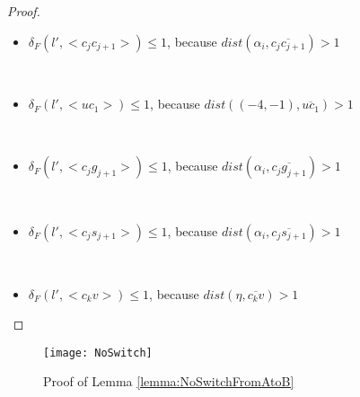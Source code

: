\documentclass[a4paper,UKenglish]{lipics}
\newcommand{\gre}{{g}}
\newcommand{\sma}{{s}}
\newcommand{\distF}{\delta_F}
\newcommand{\Seg}[1]{{\overline{#1}}}
\begin{document}
\begin{proof}
\begin{itemize}
\

\item $\distF(l',<c_jc_{j+1}>) \le 1$,  because $dist( \alpha_{i},\Seg{c_jc_{j+1}}) > 1$

\

\item $\distF(l',<uc_1>) \le 1$, because $dist( (-4,-1),\Seg{uc_1}) >1$ 

\

\item  $\distF(l',<c_j\gre_{j+1}>) \le 1$, because $dist( \alpha_i,\Seg{c_j\gre_{j+1}}) >1$ 

\

\item  $\distF(l',<c_j\sma_{j+1}>) \le 1$, because $dist( \alpha_i,\Seg{c_j\sma_{j+1}}) >1$ 

\

\item  $\distF(l',<c_kv>) \le 1$, because $dist( \eta,\Seg{c_kv}) >1$ 
\end{itemize}

\end{proof}



\begin{figure}
	\centering
	\texttt{[image: NoSwitch]}
	\caption{Proof of Lemma \ref{lemma:NoSwitchFromAtoB}}
	\label{fig:noswitch}
\end{figure}
\end{document}
